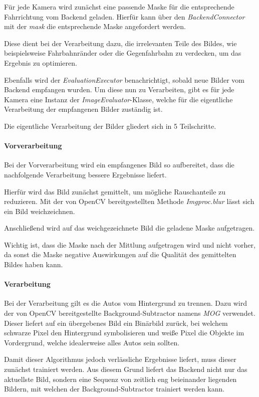 Für jede Kamera wird zunächst eine passende Maske für die entsprechende Fahrrichtung vom Backend geladen.
Hierfür kann über den {\em BackendConnector} mit der {\em mask} die entsprechende Maske angefordert werden.

Diese dient bei der Verarbeitung dazu, die irrelevanten Teile des Bildes, wie beispielsweise Fahrbahnränder oder die Gegenfahrbahn zu verdecken, um das Ergebnis zu optimieren.

Ebenfalls wird der {\em EvaluationExecutor} benachrichtigt, sobald neue Bilder vom Backend empfangen wurden.
Um diese nun zu Verarbeiten, gibt es für jede Kamera eine Instanz der {\em ImageEvaluator}-Klasse, welche für die eigentliche Verarbeitung der empfangenen Bilder zuständig ist.

Die eigentliche Verarbeitung der Bilder gliedert sich in 5 Teilschritte.

\paragraph*{Vorverarbeitung}
Bei der Vorverarbeitung wird ein empfangenes Bild so aufbereitet, dass die nachfolgende Verarbeitung bessere Ergebnisse liefert.

Hierfür wird das Bild zunächst gemittelt, um mögliche Rauschanteile zu reduzieren.
Mit der von OpenCV bereitgestellten Methode {\em Imgproc.blur} lässt sich ein Bild weichzeichnen.

Anschließend wird auf das weichgezeichnete Bild die geladene Maske aufgetragen.

Wichtig ist, dass die Maske nach der Mittlung aufgetragen wird und nicht vorher, da sonst die Maske negative Auswirkungen auf die Qualität des gemittelten Bildes haben kann.

\paragraph*{Verarbeitung}
Bei der Verarbeitung gilt es die Autos vom Hintergrund zu trennen. Dazu wird der von OpenCV bereitgestellte Background-Subtractor namens {\em MOG} verwendet.
Dieser liefert auf ein übergebenes Bild ein Binärbild zurück, bei welchem schwarze Pixel den Hintergrund symbolisieren und weiße Pixel die Objekte im Vordergrund, welche idealerweise alles Autos sein sollten.

Damit dieser Algorithmus jedoch verlässliche Ergebnisse liefert, muss dieser zunächst trainiert werden. 
Aus diesem Grund liefert das Backend nicht nur das aktuellste Bild, sondern eine Sequenz von zeitlich eng beieinander liegenden Bildern, mit welchen der Background-Subtractor trainiert werden kann. 

